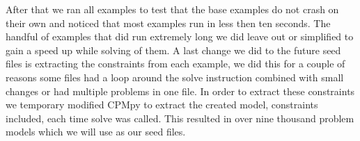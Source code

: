 After that we ran all examples to test that the base examples do not crash on their own and noticed that most examples run in less then ten seconds. The handful of examples that did run extremely long we did leave out or simplified to gain a speed up while solving of them. A last change we did to the future seed files is extracting the constraints from each example, we did this for a couple of reasons some files had a loop around the solve instruction combined with small changes or had multiple problems in one file. In order to extract these constraints we temporary modified CPMpy to extract the created model, constraints included, each time solve was called. This resulted in over nine thousand problem models which we will use as our seed files.


